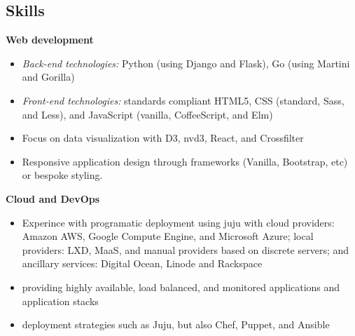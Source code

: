 \subsection{Skills}


\textbf{Web development}

\begin{itemize}
  \item \textit{Back-end technologies:} Python (using Django and Flask), Go (using Martini and Gorilla)
  \item \textit{Front-end technologies:} standards compliant HTML5, CSS (standard, Sass, and Less), and JavaScript (vanilla, CoffeeScript, and Elm)
  \item Focus on data visualization with D3, nvd3, React, and Crossfilter
  \item Responsive application design through frameworks (Vanilla, Bootstrap, etc) or bespoke styling.
\end{itemize}

\hspace{-1.5em}\textbf{Cloud and DevOps}

\begin{itemize}
  \item Experince with programatic deployment using juju with cloud providers: Amazon AWS, Google Compute Engine, and Microsoft Azure; local providers: LXD, MaaS, and manual providers based on discrete servers; and ancillary services: Digital Ocean, Linode and Rackspace
  \item providing highly available, load balanced, and monitored applications and application stacks
  \item deployment strategies such as Juju, but also Chef, Puppet, and Ansible
\end{itemize}

